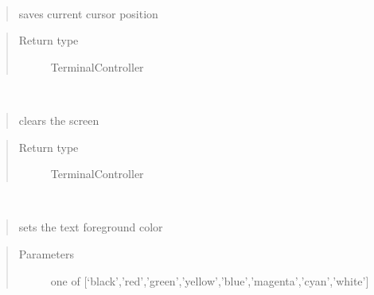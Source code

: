 \documentclass[a4paper,10pt,english]{sphinxmanual}
\begin{document}
\begin{fulllineitems}
\begin{fulllineitems}
\end{fulllineitems}


\begin{fulllineitems}
\label{\detokenize{api/termtools.terminal.TerminalController:termtools.terminal.TerminalController.bookmark}}~\begin{quote}

saves current cursor position
\end{quote}
\begin{quote}\begin{description}
\item[{Return type}] \leavevmode
TerminalController

\end{description}\end{quote}

\end{fulllineitems}


\begin{fulllineitems}
\label{\detokenize{api/termtools.terminal.TerminalController:termtools.terminal.TerminalController.clear}}~\begin{quote}

clears the screen
\end{quote}
\begin{quote}\begin{description}
\item[{Return type}] \leavevmode
TerminalController

\end{description}\end{quote}

\end{fulllineitems}


\begin{fulllineitems}
\label{\detokenize{api/termtools.terminal.TerminalController:termtools.terminal.TerminalController.color}}~\begin{quote}

sets the text foreground color
\end{quote}
\begin{quote}\begin{description}
\item[{Parameters}] \leavevmode
{} \textendash{} one of {[}‘black’,’red’,’green’,’yellow’,’blue’,’magenta’,’cyan’,’white’{]}


\end{description}
\end{quote}
\end{fulllineitems}
\end{fulllineitems}
\end{document}
